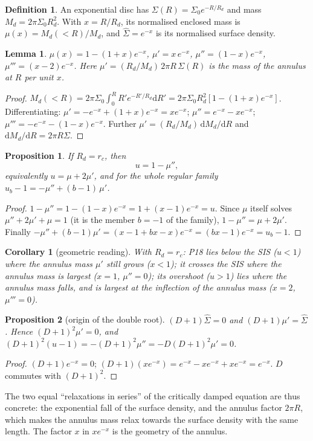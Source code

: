 \documentclass[11pt,a4paper]{article}
\newtheorem{proposition}{Proposition}
\newtheorem{lemma}{Lemma}
\newtheorem{corollary}{Corollary}
\theoremstyle{definition}
\newtheorem{definition}{Definition}
\theoremstyle{remark}
\newcommand{\rc}{r_c}
\newcommand{\Rd}{R_d}
\newcommand{\dd}{\mathrm{d}}
\begin{document}
\begin{definition}
An exponential disc has $\Sigma(R)=\Sigma_0e^{-R/\Rd}$ and mass $M_d=2\pi\Sigma_0\Rd^2$. With
$x=R/\Rd$, its normalised enclosed mass is $\mu(x)=M_d(<R)/M_d$, and $\hat\Sigma=e^{-x}$ is its
normalised surface density.
\end{definition}

\begin{lemma}\label{lem:mu}
$\mu(x)=1-(1+x)e^{-x}$, $\mu'=x\,e^{-x}$, $\mu''=(1-x)e^{-x}$, $\mu'''=(x-2)e^{-x}$. Here
$\mu'=(\Rd/M_d)\,2\pi R\,\Sigma(R)$ is the mass of the annulus at $R$ per unit $x$.
\end{lemma}
\begin{proof}
$M_d(<R)=2\pi\Sigma_0\int_0^RR'e^{-R'/\Rd}\dd R'=2\pi\Sigma_0\Rd^2[1-(1+x)e^{-x}]$.
Differentiating: $\mu'=-e^{-x}+(1+x)e^{-x}=xe^{-x}$; $\mu''=e^{-x}-xe^{-x}$;
$\mu'''=-e^{-x}-(1-x)e^{-x}$. Further $\mu'=(\Rd/M_d)\,\dd M_d/\dd R$ and
$\dd M_d/\dd R=2\pi R\Sigma$.
\end{proof}

\begin{proposition}\label{prop:disc}
If $\Rd=\rc$, then
\begin{equation}
  u=1-\mu'' ,
  \label{eq:umu}
\end{equation}
equivalently $u=\mu+2\mu'$, and for the whole regular family
$u_b-1=-\mu''+(b-1)\,\mu'$.
\end{proposition}
\begin{proof}
$1-\mu''=1-(1-x)e^{-x}=1+(x-1)e^{-x}=u$. Since $\mu$ itself solves
$\mu''+2\mu'+\mu=1$ (it is the member $b=-1$ of the family), $1-\mu''=\mu+2\mu'$. Finally
$-\mu''+(b-1)\mu'=(x-1+bx-x)e^{-x}=(bx-1)e^{-x}=u_b-1$.
\end{proof}

\begin{corollary}[geometric reading]
With $\Rd=\rc$: P18 lies below the SIS ($u<1$) where the annulus mass $\mu'$ still grows
($x<1$); it crosses the SIS where the annulus mass is largest ($x=1$, $\mu''=0$); its
overshoot ($u>1$) lies where the annulus mass falls, and is largest at the inflection of
the annulus mass ($x=2$, $\mu'''=0$).
\end{corollary}

\begin{proposition}[origin of the double root]\label{prop:double}
$(D+1)\hat\Sigma=0$ and $(D+1)\mu'=\hat\Sigma$. Hence $(D+1)^2\mu'=0$, and
$(D+1)^2(u-1)=-(D+1)^2\mu''=-D(D+1)^2\mu'=0$.
\end{proposition}
\begin{proof}
$(D+1)e^{-x}=0$; $(D+1)(xe^{-x})=e^{-x}-xe^{-x}+xe^{-x}=e^{-x}$. $D$ commutes with $(D+1)^2$.
\end{proof}
The two equal ``relaxations in series'' of the critically damped equation are thus concrete:
the exponential fall of the surface density, and the annulus factor $2\pi R$, which makes the
annulus mass relax towards the surface density with the same length. The factor $x$ in
$xe^{-x}$ is the geometry of the annulus.
\end{document}
